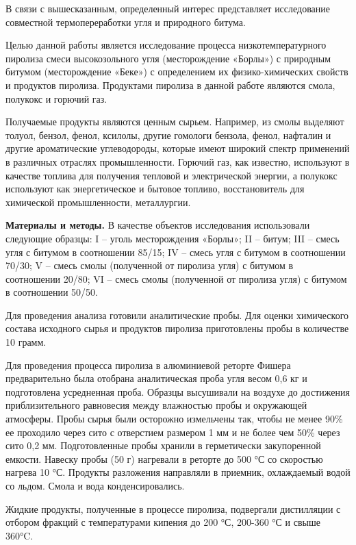 \begin{multicols}{2}
В связи с вышесказанным, определенный интерес представляет исследование
совместной термопереработки угля и природного битума.

Целью данной работы является исследование процесса низкотемпературного
пиролиза смеси высокозольного угля (месторождение «Борлы») с природным
битумом (месторождение «Беке») с определением их физико-химических
свойств и продуктов пиролиза. Продуктами пиролиза в данной работе
являются смола, полукокс и горючий газ.

Получаемые продукты являются ценным сырьем. Например, из смолы выделяют
толуол, бензол, фенол, ксилолы, другие гомологи бензола, фенол, нафталин
и другие ароматические углеводороды, которые имеют широкий спектр
применений в различных отраслях промышленности. Горючий газ, как
известно, используют в качестве топлива для получения тепловой и
электрической энергии, а полукокс используют как энергетическое и
бытовое топливо, восстановитель для химической промышленности,
металлургии.

{\bfseries Материалы и методы.} В качестве объектов исследования
использовали следующие образцы: I -- уголь месторождения «Борлы»; II --
битум; III -- смесь угля с битумом в соотношении 85/15; IV -- смесь угля
с битумом в соотношении 70/30; V -- смесь смолы (полученной от пиролиза
угля) с битумом в соотношении 20/80; VI -- смесь смолы (полученной от
пиролиза угля) с битумом в соотношении 50/50.

Для проведения анализа готовили аналитические пробы. Для оценки
химического состава исходного сырья и продуктов пиролиза приготовлены
пробы в количестве 10 грамм.

Для проведения процесса пиролиза в алюминиевой реторте Фишера
предварительно была отобрана аналитическая проба угля весом 0,6 кг и
подготовлена усредненная проба. Образцы высушивали на воздухе до
достижения приблизительного равновесия между влажностью пробы и
окружающей атмосферы. Пробы сырья были осторожно измельчены так, чтобы
не менее 90\% ее проходило через сито с отверстием размером 1 мм и не
более чем 50\% через сито 0,2 мм. Подготовленные пробы хранили в
герметически закупоренной емкости. Навеску пробы (50 г) нагревали в
реторте до 500 °С со скоростью нагрева 10 °С. Продукты разложения
направляли в приемник, охлаждаемый водой со льдом. Смола и вода
конденсировались.

Жидкие продукты, полученные в процессе пиролиза, подвергали дистилляции
с отбором фракций с температурами кипения до 200 °С, 200-360 °С и свыше
360°C.


\end{multicols}
